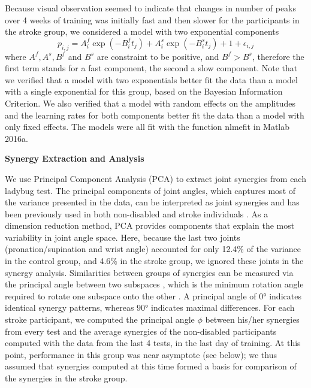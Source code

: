 Because visual observation seemed to indicate that changes in number of peaks over 4 weeks of training was initially fast and then slower for the participants in the stroke group, we considered a model with two exponential components 
\begin{equation}\label{eqn:doubleexp}
p_{i,j} = A^f_{i} \exp(-B^f_{i} t_j) + A^s_{i} \exp(-B^s_{i} t_j) + 1 + \epsilon_{i,j}
\end{equation}
where $ A^f, A^s, B^f $ and $ B^s $ are constraint to be positive, and $ B^f > B^s $, therefore the first term stands for a fast component, the second a slow component. 
Note that we verified that a model with two exponentials better fit the data than a model with a single exponential for this group, based on the Bayesian Information Criterion. 
We also verified that a model with random effects on the amplitudes and the learning rates for both components better fit the data than a model with only fixed effects. 
The models were all fit with the function \textsf{nlmefit} in Matlab 2016a.


\textbf{Synergy Extraction and Analysis}

We use Principal Component Analysis (PCA) to extract joint synergies from each ladybug test.
The principal components of joint angles, which captures most of the variance presented in the data, can be interpreted as joint synergies and has been previously used in both non-disabled and stroke individuals \cite{Soechting1997}. 
As a dimension reduction method, PCA provides components that explain the most variability in joint angle space. 
Here, because the last two joints (pronation/supination and wrist angle) accounted for only 12.4\% of the variance in the control group, and 4.6\% in the stroke group, we ignored these joints in the synergy analysis.  
Similarities between groups of synergies can be measured via the principal angle between two subspaces \cite{Bockemuehl2010}, which is the minimum rotation angle required to rotate one subspace onto the other \cite{Bjoerck1973}. 
A principal angle of $ \ang{0} $ indicates identical synergy patterns, whereas $ \ang{90} $ indicates maximal differences.  
For each stroke participant, we computed the principal angle $ \phi $ between his/her synergies from every test and the average synergies of the non-disabled participants computed with the data from the last 4 tests, in the last day of training. 
At this point, performance in this group was near asymptote (see below); we thus assumed that synergies computed at this time formed a basis for comparison of the synergies in the stroke group. 

